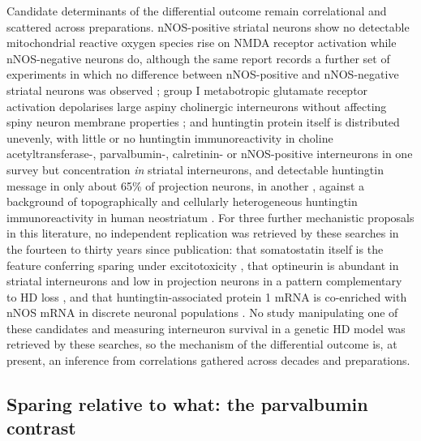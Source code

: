 \documentclass[11pt]{article}
\begin{document}
Candidate determinants of the differential outcome remain correlational and scattered across preparations. nNOS-positive striatal neurons show no detectable mitochondrial reactive oxygen species rise on NMDA receptor activation while nNOS-negative neurons do, although the same report records a further set of experiments in which no difference between nNOS-positive and nNOS-negative striatal neurons was observed \citep{Canzoniero2013}; group I metabotropic glutamate receptor activation depolarises large aspiny cholinergic interneurons without affecting spiny neuron membrane properties \citep{Calabresi1999}; and huntingtin protein itself is distributed unevenly, with little or no huntingtin immunoreactivity in choline acetyltransferase-, parvalbumin-, calretinin- or nNOS-positive interneurons in one survey \citep{Kosinski1997} but concentration \emph{in} striatal interneurons, and detectable huntingtin message in only about 65\% of projection neurons, in another \citep{Fusco1999}, against a background of topographically and cellularly heterogeneous huntingtin immunoreactivity in human neostriatum \citep{Ferrante1997}. For three further mechanistic proposals in this literature, no independent replication was retrieved by these searches in the fourteen to thirty years since publication: that somatostatin itself is the feature conferring sparing under excitotoxicity \citep{Kumar2008}, that optineurin is abundant in striatal interneurons and low in projection neurons in a pattern complementary to HD loss \citep{Okita2012}, and that huntingtin-associated protein 1 mRNA is co-enriched with nNOS mRNA in discrete neuronal populations \citep{Li1996a}. No study manipulating one of these candidates and measuring interneuron survival in a genetic HD model was retrieved by these searches, so the mechanism of the differential outcome is, at present, an inference from correlations gathered across decades and preparations.

\subsection{Sparing relative to what: the parvalbumin contrast}
\label{sec-06-parvalbumin-contrast}
\end{document}
